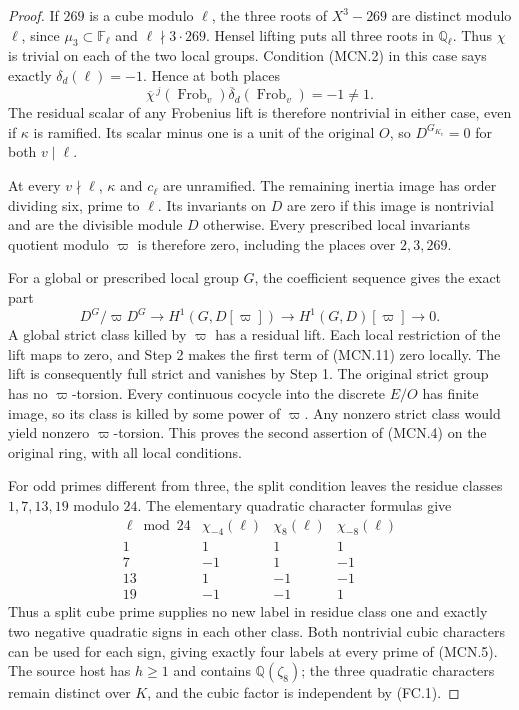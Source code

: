 \begin{proof}
If $269$ is a cube modulo $\ell$, the three roots of
$X^3-269$ are distinct modulo $\ell$, since $\mu_3\subset
\mathbb F_\ell$ and $\ell\nmid3\cdot269$.
Hensel lifting puts all three roots in $\mathbb Q_\ell$.
Thus $\chi$ is trivial on each of the two local groups.
Condition (MCN.2) in this case says exactly
$\delta_d(\ell)=-1$.  Hence at both places
\[
       \overline\chi^{\,j}(\operatorname{Frob}_v)
       \overline\delta_d(\operatorname{Frob}_v)=-1\ne1.
 \tag{MCN.10}
\]
The residual scalar of any Frobenius lift is therefore
nontrivial in either case, even if $\kappa$ is ramified.
Its scalar minus one is a unit of the original $O$,
so $D^{G_{K_v}}=0$ for both $v\mid\ell$.

At every $v\nmid\ell$, $\kappa$ and $c_\ell$ are unramified.
The remaining inertia image has order dividing six, prime
to $\ell$.  Its invariants on $D$ are zero if this image
is nontrivial and are the divisible module $D$ otherwise.
Every prescribed local invariants quotient modulo $\varpi$
is therefore zero, including the places over $2,3,269$.

For a global or prescribed local group $G$, the coefficient
sequence gives the exact part
\[
 D^G/\varpi D^G\longrightarrow H^1(G,D[\varpi])
       \longrightarrow H^1(G,D)[\varpi]\longrightarrow0.
 \tag{MCN.11}
\]
A global strict class killed by $\varpi$ has a residual
lift.  Each local restriction of the lift maps to zero,
and Step 2 makes the first term of (MCN.11) zero locally.
The lift is consequently full strict and vanishes by
Step 1.  The original strict group has no $\varpi$-torsion.
Every continuous cocycle into the discrete $E/O$ has finite
image, so its class is killed by some power of $\varpi$.
Any nonzero strict class would yield nonzero
$\varpi$-torsion.  This proves the second assertion of
(MCN.4) on the original ring, with all local conditions.

For odd primes different from three, the split condition
leaves the residue classes $1,7,13,19$ modulo $24$.
The elementary quadratic character formulas give
\[
 \begin{array}{c|rrr}
 \ell\bmod24&\chi_{-4}(\ell)&\chi_8(\ell)&\chi_{-8}(\ell)\\\hline
 1&1&1&1\\
 7&-1&1&-1\\
 13&1&-1&-1\\
 19&-1&-1&1
 \end{array}
 \tag{MCN.12}
\]
Thus a split cube prime supplies no new label in residue
class one and exactly two negative quadratic signs in
each other class.  Both nontrivial cubic characters can
be used for each sign, giving exactly four labels at
every prime of (MCN.5).  The source host has $h\geq1$ and
contains $\mathbb Q(\zeta_8)$; the three quadratic
characters remain distinct over $K$, and the cubic
factor is independent by (FC.1).


\end{proof}
